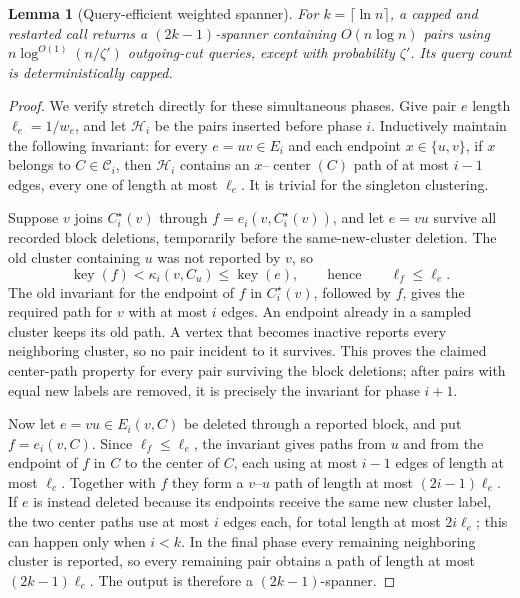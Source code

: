 \documentclass[11pt]{article}
\newtheorem{lemma}[theorem]{Lemma}
\theoremstyle{definition}
\begin{document}
\begin{lemma}[Query-efficient weighted spanner]
\label{lem:spanner}
For $k=\lceil\ln n\rceil$, a capped and restarted call returns a
$(2k-1)$-spanner containing $O(n\log n)$ pairs using
$n\log^{O(1)}(n/\zeta')$ outgoing-cut queries, except with probability
$\zeta'$.  Its query count is deterministically capped.
\end{lemma}

\begin{proof}
We verify stretch directly for these simultaneous phases.  Give pair $e$
length $\ell_e=1/w_e$, and let $\mathcal H_i$ be the pairs inserted before
phase $i$.  Inductively maintain the following invariant: for every
$e=uv\in E_i$ and each endpoint $x\in\{u,v\}$, if $x$ belongs to
$C\in\mathcal C_i$, then $\mathcal H_i$ contains an
$x$--$\operatorname{center}(C)$ path of at most $i-1$ edges, every one of
length at most $\ell_e$.  It is trivial for the singleton clustering.

Suppose $v$ joins $C_i^\star(v)$ through
$f=e_i(v,C_i^\star(v))$, and let $e=vu$ survive all recorded block
deletions, temporarily before the same-new-cluster deletion.  The old cluster
containing $u$ was not reported by $v$, so
\[
 \operatorname{key}(f)<\kappa_i(v,C_u)\le\operatorname{key}(e),
 \qquad\text{hence}\qquad \ell_f\le\ell_e.
\]
The old invariant for the endpoint of $f$ in $C_i^\star(v)$, followed by
$f$, gives the required path for $v$ with at most $i$ edges.  An endpoint
already in a sampled cluster keeps its old path.  A vertex that becomes
inactive reports every neighboring cluster, so no pair incident to it
survives.  This proves the claimed center-path property for every pair
surviving the block deletions; after pairs with equal new labels are removed,
it is precisely the invariant for phase $i+1$.

Now let $e=vu\in E_i(v,C)$ be deleted through a reported block, and put
$f=e_i(v,C)$.  Since $\ell_f\le\ell_e$, the invariant gives paths from $u$
and from the endpoint of $f$ in $C$ to the center of $C$, each using at most
$i-1$ edges of length at most $\ell_e$.  Together with $f$ they form a
$v$--$u$ path of length at most $(2i-1)\ell_e$.  If $e$ is instead deleted
because its endpoints receive the same new cluster label, the two center
paths use at most $i$ edges each, for total length at most $2i\ell_e$; this
can happen only when $i<k$.  In the final phase every remaining neighboring
cluster is reported, so every remaining pair obtains a path of length at
most $(2k-1)\ell_e$.  The output is therefore a $(2k-1)$-spanner.


\end{proof}
\end{document}
